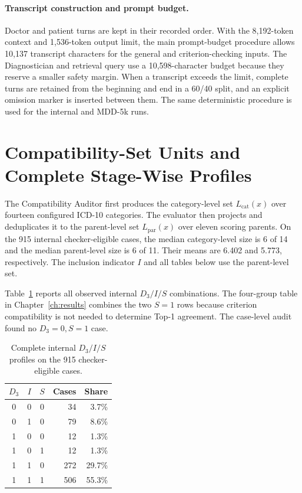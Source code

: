 \documentclass[12pt,a4paper,oneside]{report}
\begin{document}
\paragraph{Transcript construction and prompt budget.}
Doctor and patient turns are kept in their recorded order. With the
8,192-token context and 1,536-token output limit, the main prompt-budget
procedure allows 10,137 transcript characters for the general and
criterion-checking inputs. The Diagnostician and retrieval query use a
10,598-character budget because they reserve a smaller safety margin.
When a transcript exceeds the limit, complete turns are retained from the
beginning and end in a 60/40 split, and an explicit omission marker is
inserted between them. The same deterministic procedure is used for the
internal and MDD-5k runs.

\section{Compatibility-Set Units and Complete Stage-Wise Profiles}
\label{sec:complete-stage-profiles}

The Compatibility Auditor first produces the category-level set
$L_{\mathrm{cat}}(x)$ over fourteen configured ICD-10 categories. The
evaluator then projects and deduplicates it to the parent-level set
$L_{\mathrm{par}}(x)$ over eleven scoring parents. On the 915 internal
checker-eligible cases, the median category-level size is 6 of 14 and the
median parent-level size is 6 of 11. Their means are 6.402 and 5.773,
respectively. The inclusion indicator $I$ and all tables below use the
parent-level set.

Table~\ref{tab:internal-six-profiles} reports all observed internal
$D_3/I/S$ combinations. The four-group table in Chapter~\ref{ch:results}
combines the two $S=1$ rows because criterion compatibility is not needed
to determine Top-1 agreement. The case-level audit found no
$D_3=0,S=1$ case.

\begin{table}[htbp]
\centering
\caption{Complete internal $D_3/I/S$ profiles on the 915 checker-eligible cases.}
\label{tab:internal-six-profiles}
\small
\begin{tabular}{|c|c|c|r|r|}
\hline
$D_3$ & $I$ & $S$ & Cases & Share\\
\hline
0 & 0 & 0 & 34 & 3.7\%\\
\hline
0 & 1 & 0 & 79 & 8.6\%\\
\hline
1 & 0 & 0 & 12 & 1.3\%\\
\hline
1 & 0 & 1 & 12 & 1.3\%\\
\hline
1 & 1 & 0 & 272 & 29.7\%\\
\hline
1 & 1 & 1 & 506 & 55.3\%\\
\hline
\end{tabular}
\end{table}
\end{document}
